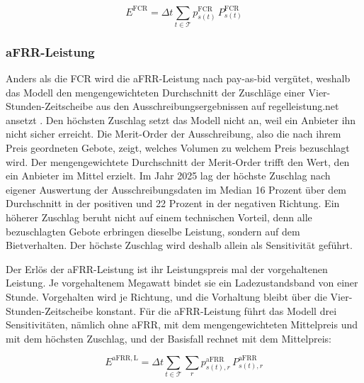 \begin{equation}
    \label{eq:erloes_fcr}
    E^{\mathrm{FCR}} = \Delta t \sum_{t \in \mathcal{T}} p^{\mathrm{FCR}}_{s(t)} \, P^{\mathrm{FCR}}_{s(t)}
\end{equation}

\subsubsection*{\acs{aFRR}-Leistung}
Anders als die \ac{FCR} wird die \ac{aFRR}-Leistung nach pay-as-bid vergütet, weshalb das Modell den mengengewichteten Durchschnitt der Zuschläge einer Vier-Stunden-Zeitscheibe aus den Ausschreibungsergebnissen auf regelleistung.net ansetzt \cite{regelleistung_ausschreibungsdaten_2026}.
Den höchsten Zuschlag setzt das Modell nicht an, weil ein Anbieter ihn nicht sicher erreicht.
Die Merit-Order der Ausschreibung, also die nach ihrem Preis geordneten Gebote, zeigt, welches Volumen zu welchem Preis bezuschlagt wird.
Der mengengewichtete Durchschnitt der Merit-Order trifft den Wert, den ein Anbieter im Mittel erzielt.
Im Jahr 2025 lag der höchste Zuschlag nach eigener Auswertung der Ausschreibungsdaten im Median 16 Prozent über dem Durchschnitt in der positiven und 22 Prozent in der negativen Richtung.
Ein höherer Zuschlag beruht nicht auf einem technischen Vorteil, denn alle bezuschlagten Gebote erbringen dieselbe Leistung, sondern auf dem Bietverhalten.
Der höchste Zuschlag wird deshalb allein als Sensitivität geführt.

Der Erlös der \ac{aFRR}-Leistung ist ihr Leistungspreis mal der vorgehaltenen Leistung.
Je vorgehaltenem Megawatt bindet sie ein Ladezustandsband von einer Stunde.
Vorgehalten wird je Richtung, und die Vorhaltung bleibt über die Vier-Stunden-Zeitscheibe konstant.
Für die \ac{aFRR}-Leistung führt das Modell drei Sensitivitäten, nämlich ohne \ac{aFRR}, mit dem mengengewichteten Mittelpreis und mit dem höchsten Zuschlag, und der Basisfall rechnet mit dem Mittelpreis:

\begin{equation}
    \label{eq:erloes_afrr_l}
    E^{\mathrm{aFRR,L}} = \Delta t \sum_{t \in \mathcal{T}} \sum_{r} p^{\mathrm{aFRR}}_{s(t),r} \, P^{\mathrm{aFRR}}_{s(t),r}
\end{equation}

